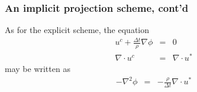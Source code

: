\begin{frame}
\frametitle{An implicit projection scheme, cont'd}
As for the explicit scheme, the equation 
\begin{eqnarray*}
u^c + \frac{\Delta t}{\rho} \nabla \phi &=& 0 \\ 
\nabla \cdot u^c &=& \nabla \cdot u^* 
\end{eqnarray*}
may be written as 
\begin{eqnarray*}
-\nabla^2  \phi &=& -\frac{\rho}{\Delta t} \nabla \cdot u^* 
\end{eqnarray*}

\end{frame}


